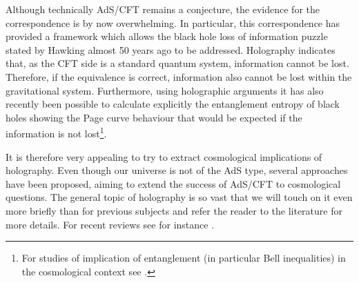 Although technically AdS/CFT remains a conjecture,
the evidence for the correspondence is by now overwhelming. In particular, this correspondence has provided a framework which 
allows the black hole loss of information puzzle stated by Hawking almost 50 years ago to be addressed. Holography 
 indicates that, as the CFT side is a standard quantum system, information cannot be lost. Therefore, if the equivalence is correct, 
information also cannot be lost within the gravitational system. Furthermore, using holographic arguments it has also recently been possible to calculate explicitly the entanglement entropy of black holes showing the Page curve behaviour that would be 
expected if the information is not lost\footnote{For studies of implication of entanglement (in particular Bell inequalities) in the cosmological context see \cite{Maldacena:2015bha, Choudhury:2016cso}.}.

It is therefore very appealing to try to extract cosmological implications of holography. Even though our universe is not of the AdS type, several approaches have been proposed, aiming to extend the success of AdS/CFT to cosmological questions. The general topic of holography is so vast 
that we will touch on it even more briefly than for previous subjects and refer the reader to the literature for more details. For recent reviews see for instance \cite{Anninos:2012qw, Flauger:2022hie}.

